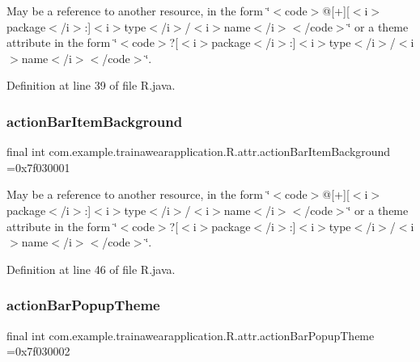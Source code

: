 May be a reference to another resource, in the form \char`\"{}$<$code$>$@\mbox{[}+\mbox{]}\mbox{[}$<$i$>$package$<$/i$>$\+:\mbox{]}$<$i$>$type$<$/i$>$/$<$i$>$name$<$/i$>$$<$/code$>$\char`\"{} or a theme attribute in the form \char`\"{}$<$code$>$?\mbox{[}$<$i$>$package$<$/i$>$\+:\mbox{]}$<$i$>$type$<$/i$>$/$<$i$>$name$<$/i$>$$<$/code$>$\char`\"{}. 

Definition at line 39 of file R.\+java.

\mbox{\label{classcom_1_1example_1_1trainawearapplication_1_1_r_1_1attr_adbc2cfb6929283362b19d8ae4b742c11}} 
\subsubsection{\texorpdfstring{actionBarItemBackground}{actionBarItemBackground}}
{\footnotesize\ttfamily final int com.\+example.\+trainawearapplication.\+R.\+attr.\+action\+Bar\+Item\+Background =0x7f030001\hspace{0.3cm}{\ttfamily [static]}}

May be a reference to another resource, in the form \char`\"{}$<$code$>$@\mbox{[}+\mbox{]}\mbox{[}$<$i$>$package$<$/i$>$\+:\mbox{]}$<$i$>$type$<$/i$>$/$<$i$>$name$<$/i$>$$<$/code$>$\char`\"{} or a theme attribute in the form \char`\"{}$<$code$>$?\mbox{[}$<$i$>$package$<$/i$>$\+:\mbox{]}$<$i$>$type$<$/i$>$/$<$i$>$name$<$/i$>$$<$/code$>$\char`\"{}. 

Definition at line 46 of file R.\+java.

\mbox{\label{classcom_1_1example_1_1trainawearapplication_1_1_r_1_1attr_a1aebe045b3707e2a4762954d495f164d}} 
\subsubsection{\texorpdfstring{actionBarPopupTheme}{actionBarPopupTheme}}
{\footnotesize\ttfamily final int com.\+example.\+trainawearapplication.\+R.\+attr.\+action\+Bar\+Popup\+Theme =0x7f030002\hspace{0.3cm}{\ttfamily [static]}}


